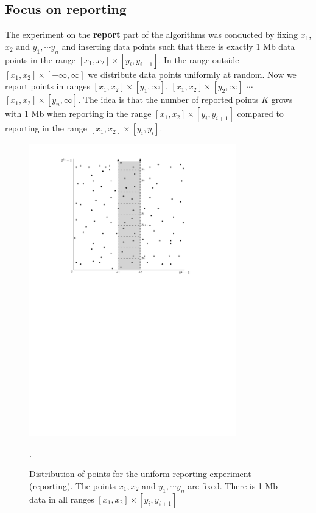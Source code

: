 \documentclass[twoside,11pt,openright]{report}
\begin{document}
\clearpage

\subsection{Focus on reporting}

The experiment on the \textbf{report} part of the algorithms was conducted by fixing $x_1$, $x_2$ and $y_1, \cdots y_n$ and inserting data points such that there is exactly 
1 Mb data points in the range $[x_1, x_2] \times [y_i, y_{i+1}]$. In the range outside  $[x_1, x_2] \times [- \infty, \infty]$ we distribute data points uniformly at random. Now we report points in ranges $[x_1, x_2] \times [y_1, \infty]$, $[x_1, x_2] \times [y_2, \infty]$ $\cdots$ $[x_1, x_2] \times [y_n, \infty]$. The idea is that the number of reported points $K$ grows with 1 Mb when reporting in the range $[x_1, x_2] \times [y_i, y_{i+1}]$ compared to reporting in the range $[x_1, x_2] \times [y_i, y_{i}]$.

\begin{figure}[h]
	\centering
	\includegraphics[width=0.8\textwidth]{../figures/query_uniform_fix_x}
	\caption{Distribution of points for the uniform reporting experiment (reporting). The points $x_1, x_2$ and $y_1, \cdots y_n$ are fixed. There is 1 Mb data in all ranges $[x_1, x_2] \times [y_i, y_{i+1}]$}.
	\label{fig:experiment_query_uniform_fix_x}
\end{figure}
\end{document}
